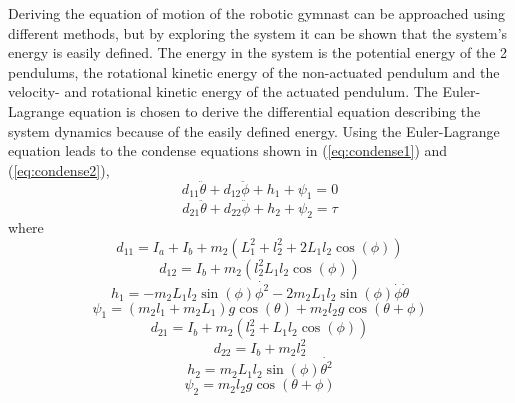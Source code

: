 Deriving the equation of motion of the robotic gymnast can be approached using different methods, but by exploring the system it can be shown that the system's energy is easily defined. The energy in the system is the potential energy of the 2 pendulums, the rotational kinetic energy of the non-actuated pendulum and the velocity- and rotational kinetic energy of the actuated pendulum. The Euler-Lagrange equation is chosen to derive the differential equation describing the system dynamics because of the easily defined energy. Using the Euler-Lagrange equation leads to the condense equations shown in (\ref{eq:condense1}) and (\ref{eq:condense2}),
\begin{equation} \label{eq:condense1}
d_{11}\ddot{\theta}+d_{12}\ddot{\phi} + h_{1} + \psi_{1} = 0
\end{equation}
\begin{equation} \label{eq:condense2}
d_{21}\ddot{\theta} + d_{22}\ddot{\phi} + h_{2} + \psi_{2} = \tau
\end{equation}
where
\begin{equation} \label{eq:d11}
d_{11} = I_{a} + I_{b} + m_{2}(L_{1}^2 + l_{2}^2+2L_{1}l_{2}\cos(\phi))
\end{equation}
\begin{equation} \label{eq:d12}
d_{12} = I_{b} +m_{2}(l_{2}^2 L_{1}l_{2}\cos(\phi))
\end{equation}
\begin{equation} \label{eq:h1}
h_{1} = -m_{2}L_{1}l_{2}\sin(\phi)\dot{\phi^2}-2m_{2}L_{1}l_{2}\sin(\phi)\dot{\phi}\dot{\theta}
\end{equation}
\begin{equation} \label{eq:psi1}
\psi_{1} = (m_{2}l_{1}+m_{2}L_{1})g\cos(\theta) + m_{2}l_{2}g\cos(\theta+\phi)
\end{equation}
\begin{equation} \label{eq:d21}
d_{21}= I_{b}+m_{2}(l_{2}^2+L_{1}l_{2}\cos(\phi))
\end{equation}
\begin{equation} \label{eq:d22}
d_{22}= I_{b}+ m_{2}l_{2}^2
\end{equation}
\begin{equation} \label{eq:h2}
h_{2}= m_{2}L_{1}l_{2}\sin(\phi)\dot{\theta^2}
\end{equation}
\begin{equation} \label{eq:psi2}
\psi_{2}= m_{2}l_{2}g\cos(\theta+\phi)
\end{equation}




